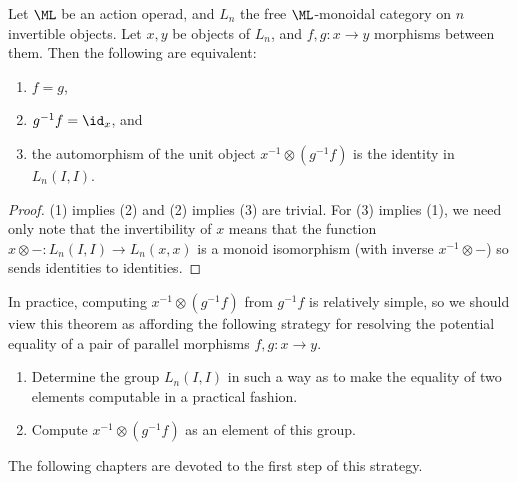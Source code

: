 \begin{thm}\label{split_coh}
Let $\ML$ be an action operad, and $L_n$ the free $\ML$-monoidal category on $n$ invertible objects. Let $x, y$ be objects of $L_n$, and $f, g \colon  x \rightarrow y$ morphisms between them. Then the following are equivalent:
\begin{enumerate}
\item $f = g$,
\item $g^{-1} f = \id_x$, and
\item the automorphism of the unit object $x^{-1} \otimes \left(g^{-1} f\right)$ is the identity in $L_n(I,I)$.
\end{enumerate}
\end{thm}
\begin{proof}
(1) implies (2) and (2) implies (3) are trivial. For (3) implies (1), we need only note that the invertibility of $x$ means that the function $x \otimes - \colon L_n(I,I) \rightarrow L_n(x,x)$ is a monoid isomorphism (with inverse $x^{-1} \otimes -$) so sends identities to identities.
\end{proof}

In practice, computing $x^{-1} \otimes \left(g^{-1} f\right)$ from $g^{-1} f$ is relatively simple, so we should view this theorem as affording the following strategy for resolving the potential equality of a pair of parallel morphisms $f, g \colon x \rightarrow y$.
\begin{enumerate}
\item Determine the group $L_n(I,I)$ in such a way as to make the equality of two elements computable in a practical fashion.
\item Compute $x^{-1} \otimes \left(g^{-1} f\right)$ as an element of this group.
\end{enumerate}
The following chapters are devoted to the first step of this strategy.
